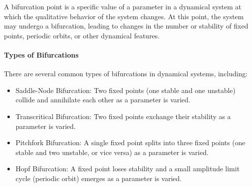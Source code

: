 \documentclass[11pt]{article}
\begin{document}
\begin{definition}
    A bifurcation point is a specific value of a parameter in a dynamical system at which the qualitative behavior of the system changes. At this point, the system may undergo a bifurcation, leading to changes in the number or stability of fixed points, periodic orbits, or other dynamical features.
    
\end{definition}

\paragraph{Types of Bifurcations} There are several common types of bifurcations in dynamical systems, including:
    \begin{itemize}
        \item Saddle-Node Bifurcation: Two fixed points (one stable and one unstable) collide and annihilate each other as a parameter is varied.
        \item Transcritical Bifurcation: Two fixed points exchange their stability as a parameter is varied.
        \item Pitchfork Bifurcation: A single fixed point splits into three fixed points (one stable and two unstable, or vice versa) as a parameter is varied.
        \item Hopf Bifurcation: A fixed point loses stability and a small amplitude limit cycle (periodic orbit) emerges as a parameter is varied.
    \end{itemize}
\end{document}

